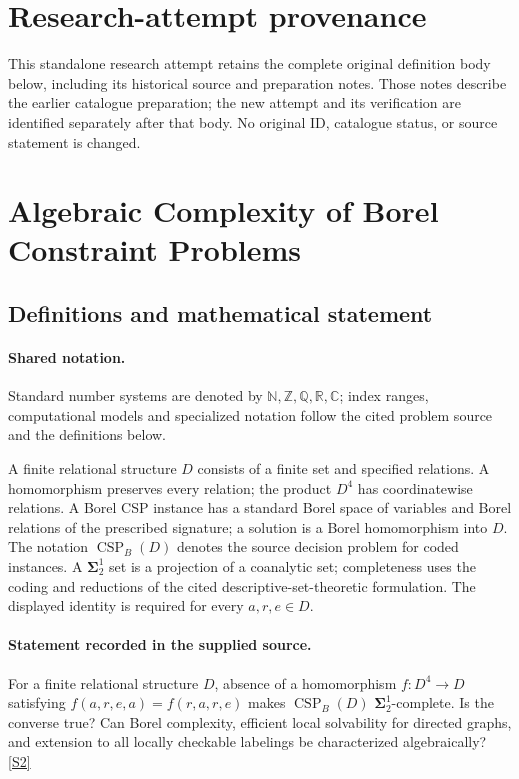 \documentclass[11pt]{article}
\begin{document}
\section*{Research-attempt provenance}
This standalone research attempt retains the complete original definition body below,
including its historical source and preparation notes. Those notes describe the
earlier catalogue preparation; the new attempt and its verification are identified
separately after that body. No original ID, catalogue status, or source statement is changed.

\section{Algebraic Complexity of Borel Constraint Problems}\label{statement}

\subsection{Definitions and mathematical statement}

\paragraph{Shared notation.}Standard number systems are denoted by $\mathbb N,\mathbb Z,\mathbb Q,\mathbb R,\mathbb C$; index ranges, computational models and specialized notation follow the cited problem source and the definitions below.


A finite relational structure $D$ consists of a finite set and specified relations. A homomorphism preserves every relation; the product $D^4$ has coordinatewise relations. A Borel CSP instance has a standard Borel space of variables and Borel relations of the prescribed signature; a solution is a Borel homomorphism into $D$. The notation $\operatorname{CSP}_B(D)$ denotes the source decision problem for coded instances. A $\boldsymbol{\Sigma}^1_2$ set is a projection of a coanalytic set; completeness uses the coding and reductions of the cited descriptive-set-theoretic formulation. The displayed identity is required for every $a,r,e\in D$.
\paragraph{Statement recorded in the supplied source.}
For a finite relational structure $D$, absence of a homomorphism $f:D^4\to D$ satisfying $f(a,r,e,a)=f(r,a,r,e)$ makes $\operatorname{CSP}_B(D)$ $\boldsymbol{\Sigma}^1_2$-complete. Is the converse true? Can Borel complexity, efficient local solvability for directed graphs, and extension to all locally checkable labelings be characterized algebraically? \href{https://doi.org/10.4171/owr/2022/8}{[S2]}
\end{document}
